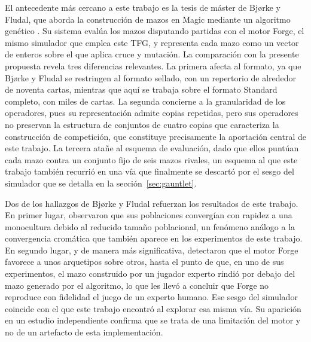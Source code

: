 El antecedente más cercano a este trabajo es la tesis de máster de Bjørke y Fludal, que aborda la construcción de mazos en Magic mediante un algoritmo genético \cite{bjorke2017}. Su sistema evalúa los mazos disputando partidas con el motor Forge, el mismo simulador que emplea este TFG, y representa cada mazo como un vector de enteros sobre el que aplica cruce y mutación. La comparación con la presente propuesta revela tres diferencias relevantes. La primera afecta al formato, ya que Bjørke y Fludal se restringen al formato sellado, con un repertorio de alrededor de noventa cartas, mientras que aquí se trabaja sobre el formato Standard completo, con miles de cartas. La segunda concierne a la granularidad de los operadores, pues su representación admite copias repetidas, pero sus operadores no preservan la estructura de conjuntos de cuatro copias que caracteriza la construcción de competición, que constituye precisamente la aportación central de este trabajo. La tercera atañe al esquema de evaluación, dado que ellos puntúan cada mazo contra un conjunto fijo de seis mazos rivales, un esquema al que este trabajo también recurrió en una vía que finalmente se descartó por el sesgo del simulador que se detalla en la sección~\ref{sec:gauntlet}.

Dos de los hallazgos de Bjørke y Fludal refuerzan los resultados de este trabajo. En primer lugar, observaron que sus poblaciones convergían con rapidez a una monocultura debido al reducido tamaño poblacional, un fenómeno análogo a la convergencia cromática que también aparece en los experimentos de este trabajo. En segundo lugar, y de manera más significativa, detectaron que el motor Forge favorece a unos arquetipos sobre otros, hasta el punto de que, en uno de sus experimentos, el mazo construido por un jugador experto rindió por debajo del mazo generado por el algoritmo, lo que les llevó a concluir que Forge no reproduce con fidelidad el juego de un experto humano. Ese sesgo del simulador coincide con el que este trabajo encontró al explorar esa misma vía. Su aparición en un estudio independiente confirma que se trata de una limitación del motor y no de un artefacto de esta implementación.

